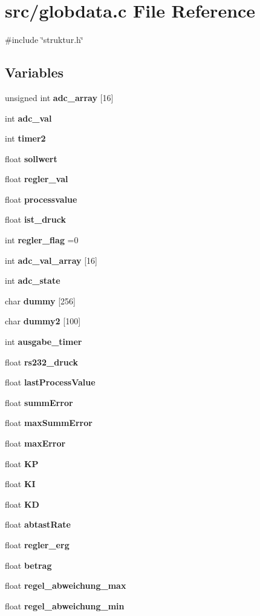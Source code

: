 \section{src/globdata.c File Reference}
\label{globdata_8c}
{\ttfamily \#include \char`\"{}struktur.\+h\char`\"{}}\newline
\subsection*{Variables}
\begin{DoxyCompactItemize}
\item 
unsigned int \textbf{ adc\+\_\+array} [16]
\item 
int \textbf{ adc\+\_\+val}
\item 
int \textbf{ timer2}
\item 
float \textbf{ sollwert}
\item 
float \textbf{ regler\+\_\+val}
\item 
float \textbf{ processvalue}
\item 
float \textbf{ ist\+\_\+druck}
\item 
int \textbf{ regler\+\_\+flag} =0
\item 
int \textbf{ adc\+\_\+val\+\_\+array} [16]
\item 
int \textbf{ adc\+\_\+state}
\item 
char \textbf{ dummy} [256]
\item 
char \textbf{ dummy2} [100]
\item 
int \textbf{ ausgabe\+\_\+timer}
\item 
float \textbf{ rs232\+\_\+druck}
\item 
float \textbf{ last\+Process\+Value}
\item 
float \textbf{ summ\+Error}
\item 
float \textbf{ max\+Summ\+Error}
\item 
float \textbf{ max\+Error}
\item 
float \textbf{ KP}
\item 
float \textbf{ KI}
\item 
float \textbf{ KD}
\item 
float \textbf{ abtast\+Rate}
\item 
float \textbf{ regler\+\_\+erg}
\item 
float \textbf{ betrag}
\item 
float \textbf{ regel\+\_\+abweichung\+\_\+max}
\item 
float \textbf{ regel\+\_\+abweichung\+\_\+min}

\end{DoxyCompactItemize}
